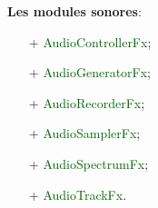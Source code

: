 \documentclass[ebook, 8pt, oneside, openany]{memoir}
\begin{document}
	\textbf{Les modules sonores}:
	\begin{itemize}
		\item[+] \textcolor{darkgreen}{AudioControllerFx};
		\item[+] \textcolor{darkgreen}{AudioGeneratorFx};
		\item[+] \textcolor{darkgreen}{AudioRecorderFx};
		\item[+] \textcolor{darkgreen}{AudioSamplerFx};
		\item[+] \textcolor{darkgreen}{AudioSpectrumFx};
		\item[+] \textcolor{darkgreen}{AudioTrackFx}.
	\end{itemize}
\end{document}
